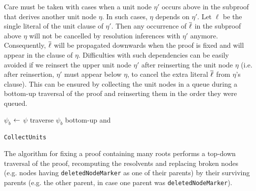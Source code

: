 \documentclass[envcountsame]{llncs}
\begin{document}
Care must be taken with cases when a unit node $\eta'$ occurs above in the subproof 
that derives another unit node $\eta$. In such cases, $\eta$ depends on $\eta'$.
Let $\ell$ be the single literal of the unit clause of $\eta'$. 
Then any occurrence of $\overline{\ell}$ in the subproof above $\eta$ will not be cancelled by 
resolution inferences with $\eta'$ anymore. Consequently,
$\overline{\ell}$ will be propagated downwards when the proof is fixed and will appear in the clause of $\eta$.
Difficulties with such dependencies can be easily avoided if we reinsert the upper unit node $\eta'$ after 
reinserting the unit node $\eta$ (i.e. after reinsertion, $\eta'$ must appear below $\eta$, 
to cancel the extra literal $\overline{\ell}$ from $\eta$'s clause). 
This can be ensured by collecting the unit nodes in a queue during a bottom-up traversal of the proof 
and reinserting them in the order they were queued.

\linesnumbered
\begin{algorithm}[t]
\begin{footnotesize}
\SetLine
{}


\BlankLine

$\psi_b$ $\leftarrow$ $\psi$\;
traverse $\psi_b$ bottom-up and 
\;
\caption{\label{algo:CollectUnits} \texttt{CollectUnits}}
\end{footnotesize}
\end{algorithm}



The algorithm for fixing a proof containing many roots performs a top-down traversal of the proof, recomputing the resolvents and replacing broken nodes (e.g. nodes having \texttt{deletedNodeMarker} as one of their parents) by their surviving parents (e.g. the other parent, in case one parent was \texttt{deletedNodeMarker}).
\end{document}
